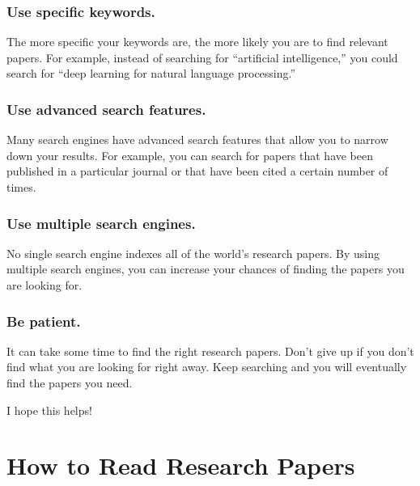 \documentclass[
  b5paper]{book}
\begin{document}
\hypertarget{use-specific-keywords.}{%
\subsubsection*{Use specific keywords.}\label{use-specific-keywords.}}

The more specific your keywords are, the more likely you are to find relevant papers. For example, instead of searching for ``artificial intelligence,'' you could search for ``deep learning for natural language processing.''

\hypertarget{use-advanced-search-features.}{%
\subsubsection*{Use advanced search features.}\label{use-advanced-search-features.}}

Many search engines have advanced search features that allow you to narrow down your results. For example, you can search for papers that have been published in a particular journal or that have been cited a certain number of times.

\hypertarget{use-multiple-search-engines.}{%
\subsubsection*{Use multiple search engines.}\label{use-multiple-search-engines.}}

No single search engine indexes all of the world's research papers. By using multiple search engines, you can increase your chances of finding the papers you are looking for.

\hypertarget{be-patient.}{%
\subsubsection*{Be patient.}\label{be-patient.}}

It can take some time to find the right research papers. Don't give up if you don't find what you are looking for right away. Keep searching and you will eventually find the papers you need.

I hope this helps!

\hypertarget{how-to-read-research-papers}{%
\section{How to Read Research Papers}\label{how-to-read-research-papers}}
\end{document}
